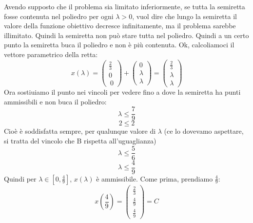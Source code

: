 Avendo supposto che il problema sia limitato inferiormente, se tutta la semiretta fosse contenuta nel poliedro per ogni $\lambda > 0$, vuol dire che lungo la semiretta il valore della funzione obiettivo decresce infinitamente, ma il problema sarebbe illimitato. Quindi la semiretta non può stare tutta nel poliedro. Quindi a un certo punto la semiretta buca il poliedro e non è più contenuta. Ok, calcoliamoci il vettore parametrico della retta:
\begin{equation*}
    x(\lambda) = \begin{pmatrix}
        \frac{2}{3}\\
        0\\\
        0
    \end{pmatrix} + \begin{pmatrix}
        0\\
        \lambda\\
        \lambda
    \end{pmatrix} = \begin{pmatrix}
        \frac{2}{3}\\
        \lambda\\
        \lambda
    \end{pmatrix}
\end{equation*}
Ora sostiuiamo il punto nei vincoli per vedere fino a dove la semiretta ha punti ammissibili e non buca il poliedro:
\begin{equation*}
    \lambda \leq \frac{7}{9}
\end{equation*}
\begin{equation*}
    2 \leq 2
\end{equation*}
Cioè è soddisfatta sempre, per qualunque valore di $\lambda$ (ce lo dovevamo aspettare, si tratta del vincolo che B rispetta all'uguaglianza)
\begin{equation*}
    \lambda \leq \frac{5}{6}
\end{equation*}
\begin{equation*}
    \lambda \leq \frac{4}{9}
\end{equation*}
Quindi per $\lambda \in [0,\frac{4}{9}]$, $x(\lambda)$ è ammissibile. Come prima, prendiamo $\frac{4}{9}$:
\begin{equation*}
    x(\frac{4}{9}) = \begin{pmatrix}
        \frac{2}{3}\\
        \frac{4}{9}\\
        \frac{4}{9}
    \end{pmatrix} = C
\end{equation*}
